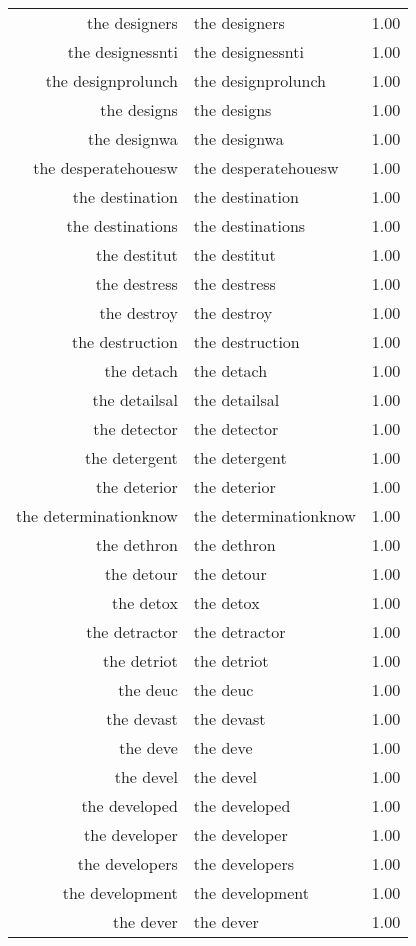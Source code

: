 \begin{table}[ht]
\begin{tabular}{rlr}
  the designers & the designers & 1.00 \\ 
  the designessnti & the designessnti & 1.00 \\ 
  the designprolunch & the designprolunch & 1.00 \\ 
  the designs & the designs & 1.00 \\ 
  the designwa & the designwa & 1.00 \\ 
  the desperatehouesw & the desperatehouesw & 1.00 \\ 
  the destination & the destination & 1.00 \\ 
  the destinations & the destinations & 1.00 \\ 
  the destitut & the destitut & 1.00 \\ 
  the destress & the destress & 1.00 \\ 
  the destroy & the destroy & 1.00 \\ 
  the destruction & the destruction & 1.00 \\ 
  the detach & the detach & 1.00 \\ 
  the detailsal & the detailsal & 1.00 \\ 
  the detector & the detector & 1.00 \\ 
  the detergent & the detergent & 1.00 \\ 
  the deterior & the deterior & 1.00 \\ 
  the determinationknow & the determinationknow & 1.00 \\ 
  the dethron & the dethron & 1.00 \\ 
  the detour & the detour & 1.00 \\ 
  the detox & the detox & 1.00 \\ 
  the detractor & the detractor & 1.00 \\ 
  the detriot & the detriot & 1.00 \\ 
  the deuc & the deuc & 1.00 \\ 
  the devast & the devast & 1.00 \\ 
  the deve & the deve & 1.00 \\ 
  the devel & the devel & 1.00 \\ 
  the developed & the developed & 1.00 \\ 
  the developer & the developer & 1.00 \\ 
  the developers & the developers & 1.00 \\ 
  the development & the development & 1.00 \\ 
  the dever & the dever & 1.00 \\ 

\end{tabular}
\end{table}
